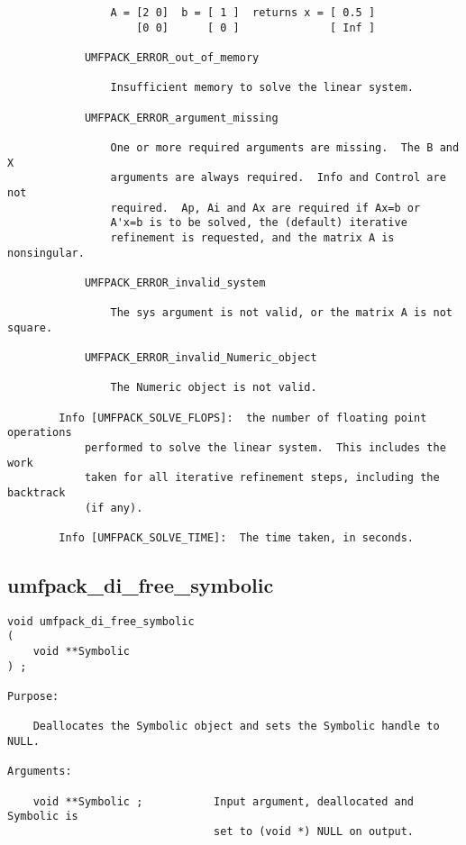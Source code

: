 \documentclass[11pt]{article}
\begin{document}
{\begin{verbatim}
                A = [2 0]  b = [ 1 ]  returns x = [ 0.5 ]
                    [0 0]      [ 0 ]              [ Inf ]

            UMFPACK_ERROR_out_of_memory

                Insufficient memory to solve the linear system.

            UMFPACK_ERROR_argument_missing

                One or more required arguments are missing.  The B and X
                arguments are always required.  Info and Control are not
                required.  Ap, Ai and Ax are required if Ax=b or
                A'x=b is to be solved, the (default) iterative
                refinement is requested, and the matrix A is nonsingular.

            UMFPACK_ERROR_invalid_system

                The sys argument is not valid, or the matrix A is not square.

            UMFPACK_ERROR_invalid_Numeric_object

                The Numeric object is not valid.

        Info [UMFPACK_SOLVE_FLOPS]:  the number of floating point operations
            performed to solve the linear system.  This includes the work
            taken for all iterative refinement steps, including the backtrack
            (if any).

        Info [UMFPACK_SOLVE_TIME]:  The time taken, in seconds.
\end{verbatim}
}


\newpage

\subsection{umfpack\_di\_free\_symbolic}
{\footnotesize
\begin{verbatim}
void umfpack_di_free_symbolic
(
    void **Symbolic
) ;

Purpose:

    Deallocates the Symbolic object and sets the Symbolic handle to NULL.

Arguments:

    void **Symbolic ;           Input argument, deallocated and Symbolic is
                                set to (void *) NULL on output.
\end{verbatim}
}
\end{document}
